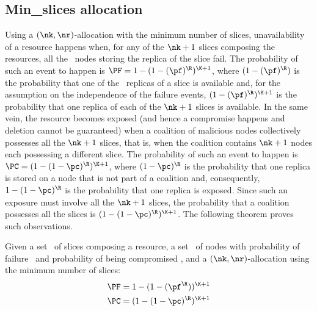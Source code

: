 {\subsection{Min\_slices allocation}\label{dcs:sec:minslice}
Using a $(\nk,\nr)$-allocation with the minimum number of slices,
unavailability of a resource happens when, for any of the $\nk+1$
slices composing the resources, all the \nr\ nodes storing the replica
of the slice fail. The probability of such an event to happen is $\PF=
1 - (1-(\pf)^{\R})^{\K+1}$, where $(1-(\pf)^{\R})$ is the probability
that one of the \nr\ replicas of a slice is available and, for the
assumption on the independence of the failure events,
$(1-(\pf)^{\R})^{\K+1}$ is the probability that one replica of each of
the $\nk+1$ slices is available. In the same vein, the resource
becomes exposed (and hence a compromise happens and deletion cannot be
guaranteed) when a coalition of malicious nodes collectively possesses
all the $\nk+1$ slices, that is, when the coalition contains $\nk+1$
nodes each possessing a different slice. The probability of such an
event to happen is $\PC= (1 - (1-\pc)^{\R})^{\K+1}$, where
$(1-\pc)^{\R}$ is the probability that one replica is stored on a node
that is not part of a coalition and, consequently, $1-(1-\pc)^{\R}$ is
the probability that one replica is exposed. Since such an exposure
must involve all the $\nk+1$ slices, the probability that a coalition
possesses all the slices is $(1 - (1-\pc)^{\R})^{\K+1}$. The following
theorem proves such observations.

\smallskip
\begin{theorem}\label{dcs:teo:probability-diagonal}
Given a set \Shards\ of slices composing a resource, a set \Nodes\ of nodes with probability of failure \pf\ and probability of being compromised \pc, and a $(\nk,\nr)$-allocation using the minimum number of slices:
	\begin{align*}
	  & \PF = 1 - (1-(\pf^{\R}))^{\K+1} \\
	  & \PC = (1 -  (1-\pc)^{\R})^{\K+1}
	\end{align*} 
\end{theorem}
\smallskip



}
